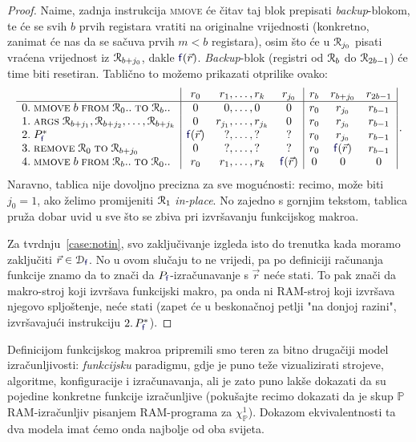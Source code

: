 \begin{proof}
Naime, zadnja instrukcija \textsc{mmove} će čitav taj blok prepisati \emph{backup}-blokom, te će se svih $b$ prvih registara vratiti na originalne vrijednosti (konkretno, zanimat će nas da se sačuva prvih $m<b$ registara), osim što će u $\mathcal R_{j_0}$ pisati vraćena vrijednost iz $\mathcal R_{b+j_0}$, dakle $\f f(\vec r)$. \emph{Backup}-blok (registri od $\mathcal R_{b}$ do $\mathcal R_{2b-1}$) će time biti resetiran. Tablično to možemo prikazati otprilike ovako:
\begin{equation}\label{eq:funmakrotab}
    \begin{array}{r@{\;}l|cr@{,\dotsc,\,}lc|ccc|}
      &                                                             & r_0          & r_1     & r_k     & r_{j_0}      & r_b & r_{b+j_0}    & r_{2b-1}\\\hline
0.&\textsc{mmove}\;b\;\textsc{from}\;\reg0..\;\textsc{to}\;\reg{b}..& 0            & 0       & 0       & 0            & r_0 & r_{j_0}      & r_{b-1} \\
1.&\textsc{args}\;\reg{b+j_1},\reg{b+j_2},\dotsc,\reg{b+j_k}        & 0            & r_{j_1} & r_{j_k} & 0            & r_0 & r_{j_0}      & r_{b-1} \\
2.&P_{\f{f}}^*                                                        & \f{f}(\vec r) & ?       & ?       & ?            & r_0 & r_{j_0}      & r_{b-1} \\
3.&\remove{0}{b+j_0}                                                & 0            & ?       & ?       & ?            & r_0 & \f f(\vec r) & r_{b-1}\\
4.&\textsc{mmove}\;b\;\textsc{from}\;\reg{b}..\;\textsc{to}\;\reg0..& r_0          & r_1     & r_k     & \f f(\vec r) & 0   & 0            & 0
    \end{array}\,\text.
\end{equation}
Naravno, tablica nije dovoljno precizna za sve mogućnosti: recimo, može biti $j_0=1$, ako želimo promijeniti $\mathcal R_{1}$ \emph{in-place}. No zajedno s gornjim tekstom, tablica pruža dobar uvid u sve što se zbiva pri izvršavanju funkcijskog makroa.

Za tvrdnju~\ref{case:notin}, svo zaključivanje izgleda isto do trenutka kada moramo zaključiti $\vec r\in\dom{\f{f}}$. No u ovom slučaju to ne vrijedi, pa po definiciji računanja funkcije znamo da to znači da $P_{\f{f}}$-izračunavanje s $\vec r$ neće stati. To pak znači da makro-stroj koji izvršava funkcijski makro, pa onda ni RAM-stroj koji izvršava njegovo spljoštenje, neće stati (zapet će u beskonačnoj petlji "na donjoj razini", izvršavajući instrukciju $2.\,P_{\f f}^*$).
\end{proof}

Definicijom funkcijskog makroa pripremili smo teren za bitno drugačiji model iz\-ra\-čun\-lji\-vo\-sti: \emph{funkcijsku} paradigmu, gdje je puno teže vizualizirati strojeve, algoritme, konfiguracije i izračunavanja, ali je zato puno lakše dokazati da su pojedine konkretne funkcije izračunljive (pokušajte recimo dokazati da je skup $\mathbb P$ RAM-izračunljiv pisanjem RAM-programa za $\chi_{\mathbb P}^1$). Dokazom ekvivalentnosti ta dva modela imat ćemo onda najbolje od oba svijeta.
